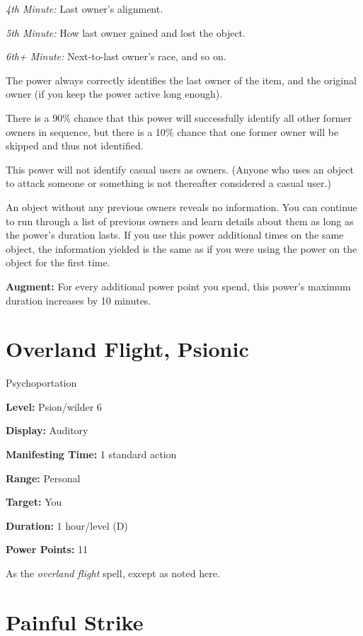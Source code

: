 \documentclass{article}
\begin{document}
\textit{4th Minute: }Last owner's alignment.

\textit{5th Minute: }How last owner gained and lost the object.

\textit{6th+ Minute: }Next-to-last owner's race, and so on.

The power always correctly identifies the last owner of the item, and the original 
owner (if you keep the power active long enough).

There is a 90\% chance that this power will successfully identify all other former 
owners in sequence, but there is a 10\% chance that one former owner will be skipped 
and thus not identified.

This power will not identify casual users as owners. (Anyone who uses an object 
to attack someone or something is not thereafter considered a casual user.)

An object without any previous owners reveals no information. You can continue 
to run through a list of previous owners and learn details about them as long as 
the power's duration lasts. If you use this power additional times on the same 
object, the information yielded is the same as if you were using the power on the 
object for the first time.

\textbf{Augment:} For every additional power point you spend, this power's maximum 
duration increases by 10 minutes.

\vspace{12pt}
\section*{Overland Flight, Psionic}

Psychoportation

\textbf{Level:} Psion/wilder 6

\textbf{Display:} Auditory

\textbf{Manifesting Time:} 1 standard action

\textbf{Range:} Personal

\textbf{Target:} You

\textbf{Duration:} 1 hour/level (D)

\textbf{Power Points:} 11

As the \textit{overland flight }spell, except as noted here.

\vspace{12pt}
\section*{Painful Strike}
\end{document}
